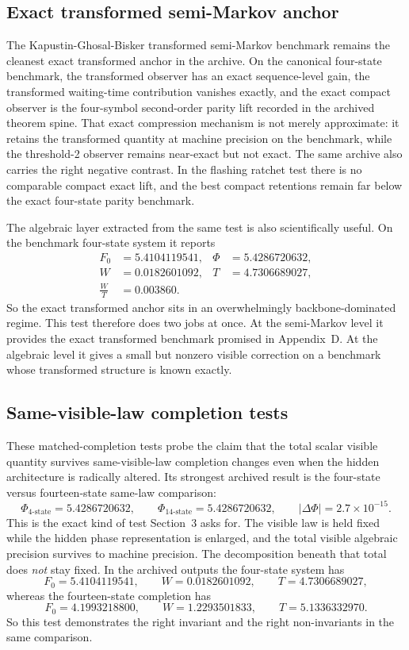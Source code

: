 \documentclass[11pt]{article}
\numberwithin{equation}{section}
\theoremstyle{thmcompact}
\theoremstyle{remark}
\begin{document}
\subsection{Exact transformed semi-Markov anchor}

The Kapustin-Ghosal-Bisker transformed semi-Markov benchmark \citep{KapustinGhosalBisker2024} remains the cleanest exact transformed anchor in the archive. On the canonical four-state benchmark, the transformed observer has an exact sequence-level gain, the transformed waiting-time contribution vanishes exactly, and the exact compact observer is the four-symbol second-order parity lift recorded in the archived theorem spine. That exact compression mechanism is not merely approximate: it retains the transformed quantity at machine precision on the benchmark, while the threshold-2 observer remains near-exact but not exact. The same archive also carries the right negative contrast. In the flashing ratchet test there is no comparable compact exact lift, and the best compact retentions remain far below the exact four-state parity benchmark.

The algebraic layer extracted from the same test is also scientifically useful. On the benchmark four-state system it reports
\[
\begin{aligned}
F_0 &= 5.4104119541, & \Phi &= 5.4286720632,\\
W &= 0.0182601092, & T &= 4.7306689027,\\
\frac{W}{T} &= 0.003860.
\end{aligned}
\]
So the exact transformed anchor sits in an overwhelmingly backbone-dominated regime. This test therefore does two jobs at once. At the semi-Markov level it provides the exact transformed benchmark promised in Appendix~D. At the algebraic level it gives a small but nonzero visible correction on a benchmark whose transformed structure is known exactly.

\subsection{Same-visible-law completion tests}

These matched-completion tests probe the claim that the total scalar visible quantity survives same-visible-law completion changes even when the hidden architecture is radically altered. Its strongest archived result is the four-state versus fourteen-state same-law comparison:
\[
\Phi_{4\text{-state}}=5.4286720632,
\qquad
\Phi_{14\text{-state}}=5.4286720632,
\qquad
|\Delta\Phi|=2.7\times 10^{-15}.
\]
This is the exact kind of test Section~3 asks for. The visible law is held fixed while the hidden phase representation is enlarged, and the total visible algebraic precision survives to machine precision. The decomposition beneath that total does \emph{not} stay fixed. In the archived outputs the four-state system has
\[
F_0=5.4104119541,
\qquad W=0.0182601092,
\qquad T=4.7306689027,
\]
whereas the fourteen-state completion has
\[
F_0=4.1993218800,
\qquad W=1.2293501833,
\qquad T=5.1336332970.
\]
So this test demonstrates the right invariant and the right non-invariants in the same comparison.
\end{document}
